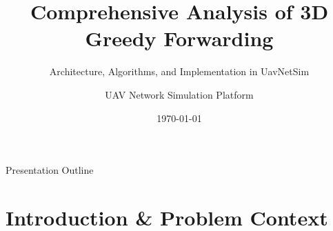 \documentclass[aspectratio=169,10pt]{beamer}
\title[Greedy Routing in UavNetSim]{\textbf{Comprehensive Analysis of 3D Greedy Forwarding}}
\subtitle{Architecture, Algorithms, and Implementation in UavNetSim}
\author[FANET Research]{UAV Network Simulation Platform}
\institute[CSE Department]{Department of Computer Science and Engineering}
\date{\today}
\begin{document}
\begin{frame}
  \titlepage
\end{frame}

\begin{frame}{Presentation Outline}
  \tableofcontents
\end{frame}

\section{Introduction \& Problem Context}
\end{document}
